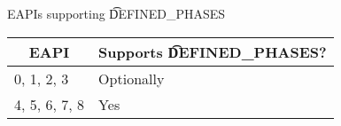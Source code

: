 
\begin{centertable}{EAPIs supporting \t{DEFINED_PHASES}}
    \label{tab:defined-phases-table}
    \begin{tabular}{ll}
      \toprule
      \multicolumn{1}{c}{\textbf{EAPI}} &
      \multicolumn{1}{c}{\textbf{Supports \t{DEFINED_PHASES}?}} \\
      \midrule
      0, 1, 2, 3        & Optionally \\
      4, 5, 6, 7, 8     & Yes        \\
      \bottomrule
    \end{tabular}
\end{centertable}


